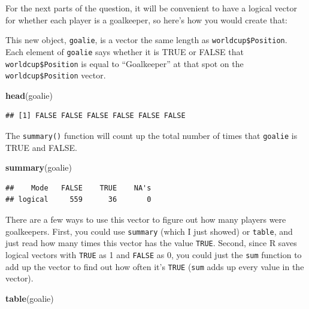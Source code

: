 \documentclass[]{book}
\makeatletter
\newenvironment{Shaded}{\begin{snugshade}}{\end{snugshade}}
\newcommand{\KeywordTok}[1]{\textcolor[rgb]{0.13,0.29,0.53}{\textbf{{#1}}}}
\newcommand{\StringTok}[1]{\textcolor[rgb]{0.31,0.60,0.02}{{#1}}}
\newcommand{\NormalTok}[1]{{#1}}
\newenvironment{kframe}{%
\medskip{}
\setlength{\fboxsep}{.8em}
 \def\at@end@of@kframe{}%
 \ifinner\ifhmode%
  \def\at@end@of@kframe{\end{minipage}}%
  \begin{minipage}{\columnwidth}%
 \fi\fi%
 \def\FrameCommand##1{\hskip\@totalleftmargin \hskip-\fboxsep
 \colorbox{shadecolor}{##1}\hskip-\fboxsep
     \hskip-\linewidth \hskip-\@totalleftmargin \hskip\columnwidth}%
 \MakeFramed {\advance\hsize-\width
   \@totalleftmargin\z@ \linewidth\hsize
   \@setminipage}}%
 {\par\unskip\endMakeFramed%
 \at@end@of@kframe}
\renewenvironment{Shaded}{\begin{kframe}}{\end{kframe}}
\makeatother
\begin{document}
For the next parts of the question, it will be convenient to have a
logical vector for whether each player is a goalkeeper, so here's how
you would create that:

\begin{Shaded}
\end{Shaded}

This new object, \texttt{goalie}, is a vector the same length as
\texttt{worldcup\$Position}. Each element of \texttt{goalie} says
whether it is TRUE or FALSE that \texttt{worldcup\$Position} is equal to
``Goalkeeper'' at that spot on the \texttt{worldcup\$Position} vector.

\begin{Shaded}
\begin{Highlighting}[]
\KeywordTok{head}\NormalTok{(goalie)}
\end{Highlighting}
\end{Shaded}

\begin{verbatim}
## [1] FALSE FALSE FALSE FALSE FALSE FALSE
\end{verbatim}

The \texttt{summary()} function will count up the total number of times
that \texttt{goalie} is TRUE and FALSE.

\begin{Shaded}
\begin{Highlighting}[]
\KeywordTok{summary}\NormalTok{(goalie)}
\end{Highlighting}
\end{Shaded}

\begin{verbatim}
##    Mode   FALSE    TRUE    NA's 
## logical     559      36       0
\end{verbatim}

There are a few ways to use this vector to figure out how many players
were goalkeepers. First, you could use \texttt{summary} (which I just
showed) or \texttt{table}, and just read how many times this vector has
the value \texttt{TRUE}. Second, since R saves logical vectors with
\texttt{TRUE} as 1 and \texttt{FALSE} as 0, you could just the
\texttt{sum} function to add up the vector to find out how often it's
\texttt{TRUE} (\texttt{sum} adds up every value in the vector).

\begin{Shaded}
\begin{Highlighting}[]
\KeywordTok{table}\NormalTok{(goalie)}
\end{Highlighting}
\end{Shaded}
\end{document}
